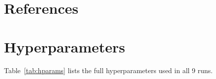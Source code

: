 \documentclass{article}
\begin{document}
\renewcommand{\bibsection}{}
\section*{References}
\small


\normalsize

\appendix

\section{Hyperparameters}
\label{app:hparams}

Table~\ref{tab:hparams} lists the full hyperparameters used in all
9 runs.
\end{document}
